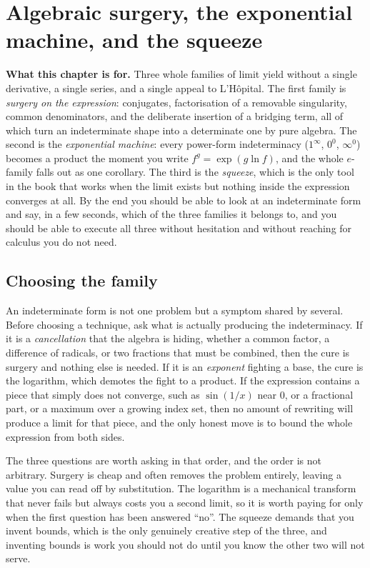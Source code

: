 \chapter{Algebraic surgery, the exponential machine, and the squeeze}

\begin{orient}
\textbf{What this chapter is for.} Three whole families of limit yield without a single derivative, a single series, and a single appeal to L'H\^opital. The first family is \emph{surgery on the expression}: conjugates, factorisation of a removable singularity, common denominators, and the deliberate insertion of a bridging term, all of which turn an indeterminate shape into a determinate one by pure algebra. The second is the \emph{exponential machine}: every power-form indeterminacy ($1^{\infty}$, $0^{0}$, $\infty^{0}$) becomes a product the moment you write $f^{g}=\exp(g\ln f)$, and the whole $e$-family falls out as one corollary. The third is the \emph{squeeze}, which is the only tool in the book that works when the limit exists but nothing inside the expression converges at all. By the end you should be able to look at an indeterminate form and say, in a few seconds, which of the three families it belongs to, and you should be able to execute all three without hesitation and without reaching for calculus you do not need.
\end{orient}

\section{Choosing the family}

An indeterminate form is not one problem but a symptom shared by several. Before choosing a technique, ask what is actually producing the indeterminacy. If it is a \emph{cancellation} that the algebra is hiding, whether a common factor, a difference of radicals, or two fractions that must be combined, then the cure is surgery and nothing else is needed. If it is an \emph{exponent} fighting a base, the cure is the logarithm, which demotes the fight to a product. If the expression contains a piece that simply does not converge, such as $\sin(1/x)$ near $0$, or a fractional part, or a maximum over a growing index set, then no amount of rewriting will produce a limit for that piece, and the only honest move is to bound the whole expression from both sides.

The three questions are worth asking in that order, and the order is not arbitrary. Surgery is cheap and often removes the problem entirely, leaving a value you can read off by substitution. The logarithm is a mechanical transform that never fails but always costs you a second limit, so it is worth paying for only when the first question has been answered ``no''. The squeeze demands that you invent bounds, which is the only genuinely creative step of the three, and inventing bounds is work you should not do until you know the other two will not serve.

